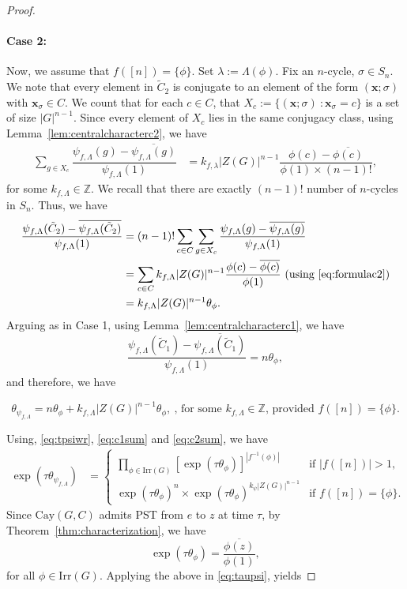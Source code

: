 \documentclass{amsart}
\theoremstyle{plain}
\theoremstyle{remark}\newtheorem{con}[theorem]{Construction}
\theoremstyle{remark} \newtheorem*{remark}{Remark}
\theoremstyle{remark} \newtheorem{example}{Example}
\newcommand{\bb}{\mathbb}
\newcommand{\mrm}{\mathrm}
\newcommand{\mbf}{\mathbf}
\newcommand{\ov}{\overline}
\newcommand{\irr}{\mathrm{Irr}}
\begin{document}
\begin{proof}
 \paragraph{Case 2:} Now, we assume that $f([n])=\{\phi\}$. Set $\lambda:=\Lambda(\phi)$. Fix an $n$-cycle, $\sigma \in S_{n}$. We note that every element in $\tilde{C}_{2}$ is conjugate to an element of the form $(\mbf{x}; \sigma)$ with $\mbf{x}_{\sigma} \in C$. We count that for each $c \in C$, that $X_{c}:=\{(\mbf{x}; \sigma) \ : \mbf{x}_{\sigma} = c \}$ is a set of size $|G|^{n-1}$.  Since every element of $X_{c}$ lies in the same conjugacy class, using Lemma~\ref{lem:centralcharacterc2}, we have
 \begin{align}\label{eq:formulac2}
     \sum\limits_{g \in X_{c}}\dfrac{\psi_{f,\Lambda}(g)-\ov{\psi_{f,\Lambda}(g)}}{\psi_{f, \Lambda}(1)} & =k_{f, \lambda} |Z(G)|^{n-1} \dfrac{\phi(c)-\ov{\phi(c)}}{\phi(1)\times (n-1)!},
 \end{align}
 for some $k_{f,\Lambda}\in \bb{Z}$.
 We recall that there are exactly $(n-1)!$ number of $n$-cycles in $S_{n}$. Thus, we have
\begin{align*}
\dfrac{\psi_{f, \Lambda}(\tilde{C}_{2})-\ov{\psi_{f, \Lambda}(\tilde{C}_{2})}}{\psi_{f, \Lambda}(1)} &= (n-1)!\sum\limits_{c \in C}\sum\limits_{g \in X_{c}}\dfrac{\psi_{f,\Lambda}(g)-\ov{\psi_{f,\Lambda}(g)}}{\psi_{f, \Lambda}(1)} \\
&= \sum\limits_{c \in C}k_{f,\Lambda}|Z(G)|^{n-1} \dfrac{\phi(c) - \ov{\phi(c)}}{\phi(1)} \ \text{(using \eqref{eq:formulac2})}\\
&=k_{f,\Lambda}|Z(G)|^{n-1}\theta_{\phi}.
\end{align*}
Arguing as in Case 1, using Lemma~\ref{lem:centralcharacterc1}, we have
\[\dfrac{\psi_{f, \Lambda}(\tilde{C}_{1})-\ov{\psi_{f, \Lambda}(\tilde{C}_{1})}}{\psi_{f, \Lambda}(1)}=n\theta_{\phi},\] and therefore, we have 

\begin{equation}\label{eq:c2sum}
\theta_{\psi_{f, \Lambda}} = n \theta_{\phi} + k_{f,\Lambda}|Z(G)|^{n-1}\theta_{\phi},\ \text{, for some $k_{f,\Lambda}\in \bb{Z}$, provided $f([n])=\{\phi\}$.}
\end{equation}

Using, \eqref{eq:tpsiwr}, \eqref{eq:c1sum} and \eqref{eq:c2sum}, we have 
\begin{align}\label{eq:taupsi}
\exp\left( \tau \theta_{\psi_{f,\Lambda}}\right) &= \begin{cases} \prod\limits_{\phi \in \irr(G)} \left[ \exp\left( \tau \theta_{\phi} \right) \right]^{|f^{-1}(\phi)|} & \text{if $|f([n])|>1$,}\\
\exp{(\tau\theta_{\phi})}^{n} \times \exp(\tau \theta_{\phi})^{k_{\psi} |Z(G)|^{n-1}} &\text{if $f([n])=\{\phi\}$.} 
\end{cases}
\end{align}
Since $\mrm{Cay}(G, C)$ admits PST from $e$ to $z$ at time $\tau$, by Theorem~\ref{thm:characterization}, we have \[\exp\left( \tau \theta_{\phi} \right) = \frac{\ov{\phi(z)}}{\phi(1)},\] for all $\phi \in \irr(G)$. Applying the above in \eqref{eq:taupsi}, yields


\end{proof}
\end{document}
